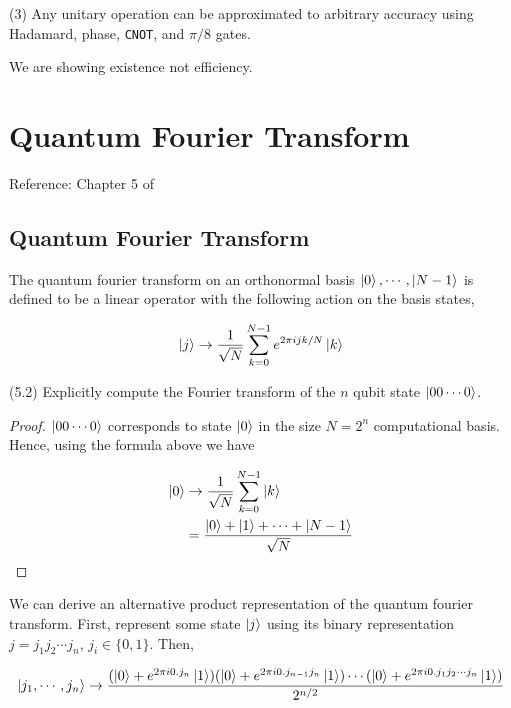 \documentclass[main.tex]{subfiles}
\begin{document}
\begin{subappendices}
(3) Any unitary operation can be approximated to arbitrary accuracy using Hadamard, phase, \texttt{CNOT}, and $\pi / 8$ gates.

We are showing existence not efficiency.

\section{Quantum Fourier Transform}
Reference: Chapter 5 of \cite{nielsen2010quantum}

\subsection{Quantum Fourier Transform}

The quantum fourier transform on an orthonormal basis $\ket{0}, \cdots ,\ket{N - 1}$ is defined to be a linear operator with the following action on the basis states,

\begin{align*}
\ket{j} \rightarrow \frac{1}{\sqrt{N}} \sum_{k=0}^{N-1} e^{2\pi i jk / N} \ket{k}	
\end{align*}


\begin{exercise}(5.2) Explicitly compute the Fourier transform of the $n$ qubit state $\ket{00\cdots 0}$.
\begin{proof}
	$\ket{00 \cdots 0 }$ corresponds to state $\ket{0}$ in the size $N = 2^n$ computational basis. Hence, using the formula above we have 
	
	\begin{align*}
	\ket{0} &\rightarrow \frac{1}{\sqrt{N}} \sum_{k=0}^{N-1} \ket{k} \\
	&= 	\frac{\ket{0} + \ket{1} + \cdots + \ket{N-1}}{\sqrt{N}}
	\end{align*}

\end{proof}
	
\end{exercise}

We can derive an alternative product representation of the quantum fourier transform. First, represent some state $\ket{j}$ using its binary representation $j=j_1j_2 \cdots j_n$, $j_i \in \{0, 1\}$. Then,

\begin{align*}
\ket{j_1 , \cdots , j_n } \rightarrow \frac{(\ket{0} + e^{2\pi i 0.j_n} \ket{1})(\ket{0} + e^{2\pi i 0.j_{n-1}j_n} \ket{1})\cdots (\ket{0} + e^{2\pi i 0.j_1j_2 \cdots j_n} \ket{1})}{2^{n/2}}
\end{align*}


\end{subappendices}
\end{document}
